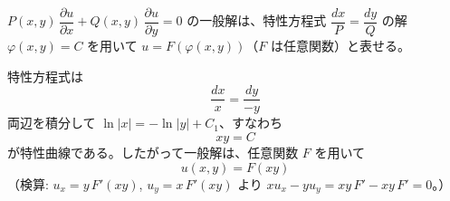 
$P(x,y)\,\dfrac{\partial u}{\partial x} + Q(x,y)\,\dfrac{\partial u}{\partial y} = 0$ の一般解は、特性方程式 $\dfrac{dx}{P} = \dfrac{dy}{Q}$ の解 $\varphi(x,y) = C$ を用いて $u = F(\varphi(x,y))$（$F$ は任意関数）と表せる。

特性方程式は
\[
\frac{dx}{x} = \frac{dy}{-y}
\]
両辺を積分して $\ln|x| = -\ln|y| + C_{1}$、すなわち
\[
xy = C
\]
が特性曲線である。したがって一般解は、任意関数 $F$ を用いて
\[
\boxed{\; u(x,y) = F(xy) \;}
\]
（検算: $u_x = y\,F'(xy)$, $u_y = x\,F'(xy)$ より $x u_x - y u_y = xy\,F' - xy\,F' = 0$。）
